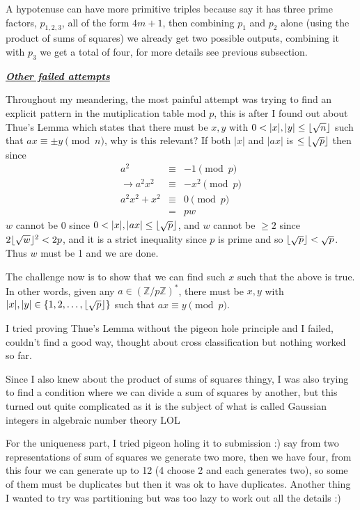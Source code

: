 \documentclass[aps,preprint,preprintnumbers,nofootinbib,showpacs,prd]{revtex4-1}
\newcommand{\nbea}{\begin{eqnarray*}}
\newcommand{\neea}{\end{eqnarray*}}
\DeclarePairedDelimiter{\floor}{\lfloor}{\rfloor}
\begin{document}
A hypotenuse can have more primitive triples because say it has three prime factors, $p_{1,2,3}$, all of the form $4m + 1$, then combining $p_1$ and $p_2$ alone (using the product of sums of squares) we already get two possible outputs, combining it with $p_3$ we get a total of four, for more details see previous subsection.

\smallskip
\underline{\textit{\textbf{Other failed attempts}}}
\smallskip

Throughout my meandering, the most painful attempt was trying to find an explicit pattern in the mutiplication table mod $p$, this is after I found out about Thue's Lemma which states that there must be $x,y$ with $0<|x|,|y|\le \floor{\sqrt{n}}$ such that $ax \equiv \pm y \pmod{n}$, why is this relevant? If both $|x|$ and $|ax|$ is $\le \floor{\sqrt{p}}$ then since
%
\nbea
a^2 & \equiv & -1 \pmod{p} \\
\to a^2x^2 & \equiv & -x^2 \pmod{p} \\
a^2x^2 + x^2 & \equiv & 0 \pmod{p} \\
& = & pw
\neea
%
$w$ cannot be 0 since $0 < |x|, |ax| \le \floor{\sqrt{p}}$, and $w$ cannot be $\ge 2$ since $2\floor{\sqrt{w}}^2 < 2p$, and it is a strict inequality since $p$ is prime and so $\floor{\sqrt{p}} < \sqrt{p}$. Thus $w$ must be 1 and we are done.

The challenge now is to show that we can find such $x$ such that the above is true. In other words, given any $a \in (\mathbb{Z}/p\mathbb{Z})^*$, there must be $x, y$ with $|x|,|y| \in \{1,2,\dots,\floor{\sqrt{p}}\}$ such that $ax \equiv y \pmod{p}$.

I tried proving Thue's Lemma without the pigeon hole principle and I failed, couldn't find a good way, thought about cross classification but nothing worked so far.

Since I also knew about the product of sums of squares thingy, I was also trying to find a condition where we can divide a sum of squares by another, but this turned out quite complicated as it is the subject of what is called Gaussian integers in algebraic number theory LOL

For the uniqueness part, I tried pigeon holing it to submission :) say from two representations of sum of squares we generate two more, then we have four, from this four we can generate up to 12 (4 choose 2 and each generates two), so some of them must be duplicates but then it was ok to have duplicates. Another thing I wanted to try was partitioning but was too lazy to work out all the details :)
\end{document}
